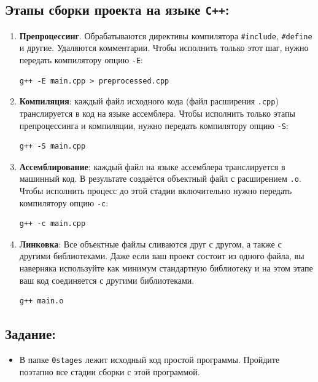 \documentclass{article}
\begin{document}
\subsection*{Этапы сборки проекта на языке \texttt{C++}:}
\begin{enumerate}
\item \textbf{Препроцессинг}. Обрабатываются директивы компилятора \texttt{\#include}, \texttt{\#define} и другие. Удаляются комментарии. Чтобы исполнить только этот шаг, нужно передать компилятору опцию \texttt{-E}:
\begin{verbatim}
g++ -E main.cpp > preprocessed.cpp
\end{verbatim}
\item \textbf{Компиляция}: каждый файл исходного кода (файл расширения \texttt{.cpp}) транслируется в код на языке ассемблера. Чтобы исполнить только этапы препроцессинга и компиляции, нужно передать компилятору опцию \texttt{-S}:
\begin{verbatim}
g++ -S main.cpp
\end{verbatim}
\item \textbf{Ассемблирование}: каждый файл на языке ассемблера транслируется в машинный код. В результате создаётся объектный файл с расширением \texttt{.o}. Чтобы исполнить процесс до этой стадии включительно нужно передать компилятору опцию \texttt{-c}:
\begin{verbatim}
g++ -c main.cpp
\end{verbatim}
\item \textbf{Линковка}: Все объектные файлы сливаются друг с другом, а также с другими библиотеками. Даже если ваш проект состоит из одного файла, вы наверняка используйте как минимум стандартную библиотеку и на этом этапе ваш код соединяется с другими библиотеками.
\begin{verbatim}
g++ main.o
\end{verbatim}
\end{enumerate}


\subsection*{Задание:}
\begin{itemize}
\item В папке \texttt{0stages} лежит исходный код простой программы. Пройдите поэтапно все стадии сборки с этой программой.
\end{itemize}
\end{document}
